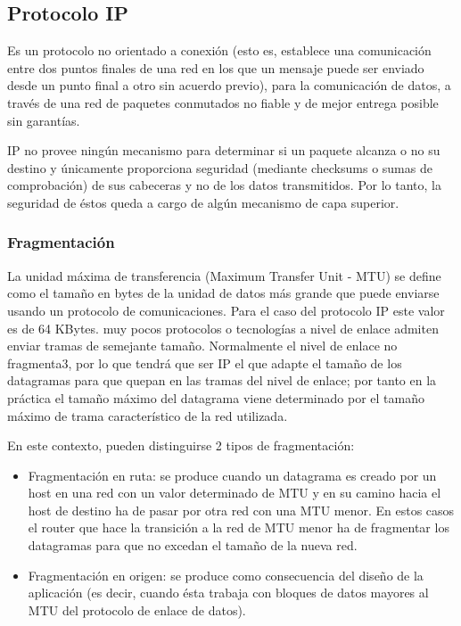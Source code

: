 \subsection{Protocolo IP}

Es un protocolo no orientado a conexión (esto es, establece una comunicación entre dos puntos finales de una red en los que un mensaje puede ser enviado desde un punto final a otro sin acuerdo previo), para la comunicación de datos, a través de una red de paquetes conmutados no fiable y de mejor entrega posible sin garantías.

 IP no provee ningún mecanismo para determinar si un paquete alcanza o no su destino y únicamente proporciona seguridad (mediante checksums o sumas de comprobación) de sus cabeceras y no de los datos transmitidos. Por lo tanto, la seguridad de éstos queda a cargo de algún mecanismo de capa superior.

\subsubsection{Fragmentación}

La unidad máxima de transferencia (Maximum Transfer Unit - MTU) se define como el tamaño en bytes de la unidad de datos más grande que puede enviarse usando un protocolo de comunicaciones. Para el caso del protocolo IP este valor es de 64 KBytes. muy pocos protocolos o tecnologías a nivel de enlace admiten enviar tramas de semejante tamaño. Normalmente el nivel de enlace no fragmenta3, por lo que tendrá que ser IP el que adapte el tamaño de los datagramas para que quepan en las tramas del nivel de enlace; por tanto en la práctica el tamaño máximo del datagrama viene determinado por el tamaño máximo de trama característico de la red utilizada.

En este contexto, pueden distinguirse 2 tipos de fragmentación:

\begin{itemize}
	\item Fragmentación en ruta: se produce cuando un datagrama es creado por un host en una red con un valor determinado de MTU y en su camino hacia el host de destino ha de pasar por otra red con una MTU menor. En estos casos el router que hace la transición a la red de MTU menor ha de fragmentar los datagramas para que no excedan el tamaño de la nueva red.
	\item Fragmentación en origen: se produce como consecuencia del diseño de la aplicación (es decir, cuando ésta trabaja con bloques de datos mayores al MTU del protocolo de enlace de datos).	
\end{itemize}

